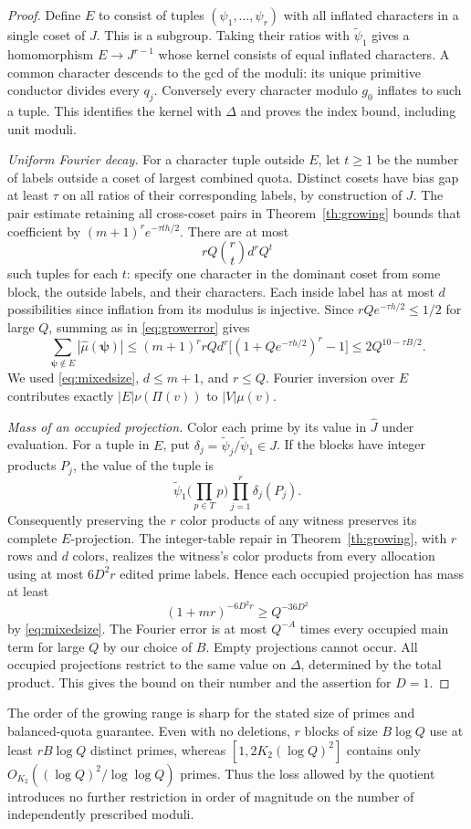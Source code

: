 \begin{proof}
Define \(E\) to consist of tuples \((\psi_1,\dots,\psi_r)\) with all inflated characters in a single coset of \(J\). This is a subgroup. Taking their ratios with \(\widetilde\psi_1\) gives a homomorphism \(E\to J^{r-1}\) whose kernel consists of equal inflated characters. A common character descends to the gcd of the moduli: its unique primitive conductor divides every \(q_j\). Conversely every character modulo \(g_0\) inflates to such a tuple. This identifies the kernel with \(\Delta\) and proves the index bound, including unit moduli.

\emph{Uniform Fourier decay.}
For a character tuple outside \(E\), let \(t\ge1\) be the number of labels outside a coset of largest combined quota. Distinct cosets have bias gap at least \(\tau\) on all ratios of their corresponding labels, by construction of \(J\). The pair estimate retaining all cross-coset pairs in Theorem~\ref{th:growing} bounds that coefficient by \((m+1)^r e^{-\tau t h/2}\). There are at most
\[
 rQ\binom rt d^r Q^t
\]
such tuples for each \(t\): specify one character in the dominant coset from some block, the outside labels, and their characters. Each inside label has at most \(d\) possibilities since inflation from its modulus is injective. Since \(rQ e^{-\tau h/2}\le1/2\) for large \(Q\), summing as in \eqref{eq:growerror} gives
\[
 \sum_{\boldsymbol\psi\notin E}|\widehat\mu(\boldsymbol\psi)|
 \le (m+1)^r rQ d^r\big[(1+Qe^{-\tau h/2})^r-1\big]
 \le 2Q^{10-\tau B/2}.
\]
We used \eqref{eq:mixedsize}, \(d\le m+1\), and \(r\le Q\). Fourier inversion over \(E\) contributes exactly \(|E|\nu(\Pi(v))\) to \(|V|\mu(v)\).

\emph{Mass of an occupied projection.}
Color each prime by its value in \(\widehat J\) under evaluation. For a tuple in \(E\), put \(\delta_j=\widetilde\psi_j/\widetilde\psi_1\in J\). If the blocks have integer products \(P_j\), the value of the tuple is
\[
 \widetilde\psi_1\Big(\prod_{p\in T}p\Big)\prod_{j=1}^r\delta_j(P_j).
\]
Consequently preserving the \(r\) color products of any witness preserves its complete \(E\)-projection. The integer-table repair in Theorem~\ref{th:growing}, with \(r\) rows and \(d\) colors, realizes the witness's color products from every allocation using at most \(6D^2r\) edited prime labels. Hence each occupied projection has mass at least
\[
    (1+mr)^{-6D^2r}\ge Q^{-36D^2}
\]
by \eqref{eq:mixedsize}. The Fourier error is at most \(Q^{-A}\) times every occupied main term for large \(Q\) by our choice of \(B\). Empty projections cannot occur. All occupied projections restrict to the same value on \(\Delta\), determined by the total product. This gives the bound on their number and the assertion for \(D=1\).
\end{proof}

The order of the growing range is sharp for the stated size of primes and balanced-quota guarantee. Even with no deletions, \(r\) blocks of size \(B\log Q\) use at least \(rB\log Q\) distinct primes, whereas \([1,2K_2(\log Q)^2]\) contains only \(O_{K_2}((\log Q)^2/\log\log Q)\) primes. Thus the loss allowed by the quotient introduces no further restriction in order of magnitude on the number of independently prescribed moduli.

